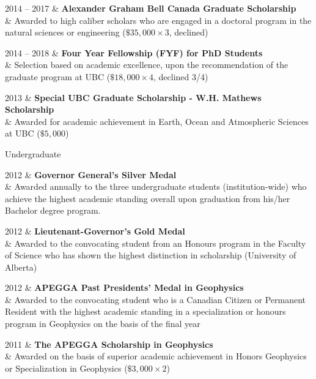 \documentclass[a4paper, 11pt]{article}
\newcommand{\subheading}[1]{
    \vspace{0.4cm}
    {\Large #1}\\
    \vspace{-0.2cm}
}
\begin{document}
\begin{entryright}
2014 -- 2017 & \textbf{Alexander Graham Bell Canada Graduate Scholarship} \\
& Awarded to high caliber scholars who are engaged in a doctoral program in the natural sciences or engineering ($ \$35,000 \times 3$, declined)
\end{entryright}

\begin{entryright}
2014 -- 2018 & \textbf{Four Year Fellowship (FYF) for PhD Students} \\
& Selection based on academic excellence, upon the recommendation of the graduate program at UBC ($\$18,000 \times 4$, declined 3/4)
\end{entryright}

\begin{entryright}
2013 & \textbf{Special UBC Graduate Scholarship - W.H. Mathews Scholarship} \\
& Awarded for academic achievement in Earth, Ocean and Atmospheric Sciences at UBC ($\$5,000$)
\end{entryright}

\subheading{Undergraduate}
\begin{entryright}
2012 & \textbf{Governor General's Silver Medal} \\
& Awarded annually to the three undergraduate students (institution-wide) who achieve the highest academic standing overall upon graduation from his/her Bachelor degree program.
\end{entryright}

\begin{entryright}
2012 & \textbf{Lieutenant-Governor's Gold Medal} \\
& Awarded to the convocating student from an Honours program in the Faculty of Science who has shown the highest distinction in scholarship (University of Alberta)
\end{entryright}

\begin{entryright}
2012 & \textbf{APEGGA Past Presidents' Medal in Geophysics} \\
& Awarded to the convocating student who is a Canadian Citizen or Permanent Resident with the highest academic standing in a specialization or honours program in Geophysics on the basis of the final year
\end{entryright}

\begin{entryright}
2011 & \textbf{The APEGGA Scholarship in Geophysics} \\
& Awarded on the basis of superior academic achievement in Honors Geophysics or Specialization in Geophysics ($\$3,000 \times 2$)
\end{entryright}
\end{document}
